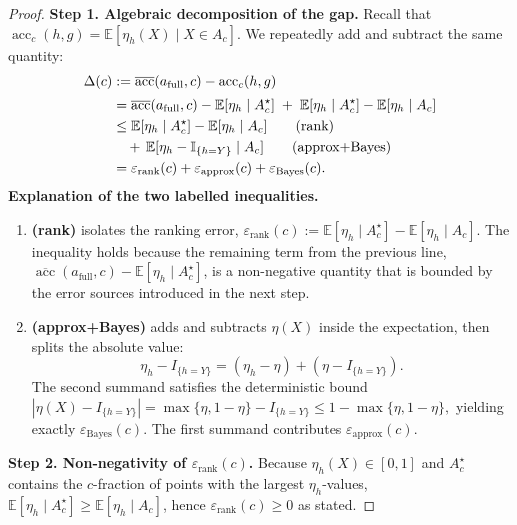 \begin{proof}
\textbf{Step 1.  Algebraic decomposition of the gap.}
Recall that
\(\operatorname{acc}_c(h,g)
   =\mathbb E[\eta_h(X)\mid X\in A_c]\).
We repeatedly add and subtract the same quantity:
\begin{align}
\Delta(c)
&:=\overline{\operatorname{acc}}(a_{\mathrm{full}},c)
  -\operatorname{acc}_c(h,g)  \notag\\[2pt]
&=\overline{\operatorname{acc}}(a_{\mathrm{full}},c)
  -\mathbb E[\eta_h\mid A_c^{\star}]
  \;+\;\mathbb E[\eta_h\mid A_c^{\star}]
  -\mathbb E[\eta_h\mid A_c] \notag\\
&\le
  \mathbb E[\eta_h\mid A_c^{\star}]
  -\mathbb E[\eta_h\mid A_c]                   \tag{rank}\\
&\quad
  +\,\mathbb E[\eta_h-\mathbb{I}_{\{h=Y\}}\mid A_c] \tag{approx+Bayes}\\
&= \varepsilon_{\mathrm{rank}}(c)
   +\varepsilon_{\mathrm{approx}}(c)
   +\varepsilon_{\mathrm{Bayes}}(c).
\end{align}
\textbf{Explanation of the two labelled inequalities.}
\begin{enumerate}
    \item \textbf{(rank)} isolates the ranking error, $\varepsilon_{\text{rank}}(c) := \mathbb{E}[\eta_h \mid A_c^{\star}] - \mathbb{E}[\eta_h \mid A_c]$.  The inequality holds because the remaining term from the previous line, $\overline{\operatorname{acc}}(a_{\text{full}}, c) - \mathbb{E}[\eta_h \mid A_c^{\star}]$, is a non-negative quantity that is bounded by the error sources introduced in the next step.
   \item \textbf{(approx+Bayes)} adds and subtracts \(\eta(X)\) inside the
   expectation, then splits the absolute value:
   \begin{equation}
   \eta_h-I_{\{h=Y\}}
   =(\eta_h-\eta)+(\eta-I_{\{h=Y\}}).
   \end{equation}
   The second summand satisfies the deterministic bound
   \(
     |\eta(X)-I_{\{h=Y\}}|
     = \max\{\eta,1-\eta\}-I_{\{h=Y\}}
     \le 1-\max\{\eta,1-\eta\},
   \)
   yielding exactly \(\varepsilon_{\mathrm{Bayes}}(c)\).
   The first summand contributes
   \(\varepsilon_{\mathrm{approx}}(c)\).
\end{enumerate}

\textbf{Step 2.  Non‑negativity of \(\varepsilon_{\mathrm{rank}}(c)\).}
Because \(\eta_h(X)\in[0,1]\) and
\(A_c^{\star}\) contains the \(c\)-fraction of points with the
largest \(\eta_h\)-values,
\(\mathbb E[\eta_h\mid A_c^{\star}]
 \ge\mathbb E[\eta_h\mid A_c]\),
hence \(\varepsilon_{\mathrm{rank}}(c)\ge0\) as stated.


\end{proof}
